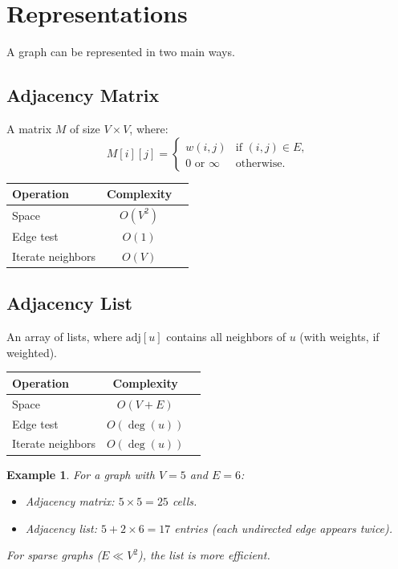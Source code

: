 \documentclass[11pt,a4paper]{article}
\newtheorem{example}[theorem]{Example}
\begin{document}
\section{Representations}

A graph can be represented in two main ways.

\subsection{Adjacency Matrix}

A matrix $M$ of size $V \times V$, where:
\[
M[i][j] = \begin{cases}
w(i, j) & \text{if } (i, j) \in E, \\
0 \text{ or } \infty & \text{otherwise.}
\end{cases}
\]

\begin{center}
\begin{tabular}{lcc}
\toprule
Operation & Complexity \\
\midrule
Space & $O(V^2)$ \\
Edge test & $O(1)$ \\
Iterate neighbors & $O(V)$ \\
\bottomrule
\end{tabular}
\end{center}

\subsection{Adjacency List}

An array of lists, where $\text{adj}[u]$ contains all neighbors of $u$ (with weights, if weighted).

\begin{center}
\begin{tabular}{lcc}
\toprule
Operation & Complexity \\
\midrule
Space & $O(V + E)$ \\
Edge test & $O(\deg(u))$ \\
Iterate neighbors & $O(\deg(u))$ \\
\bottomrule
\end{tabular}
\end{center}

\begin{example}
For a graph with $V = 5$ and $E = 6$:
\begin{itemize}
    \item Adjacency matrix: $5 \times 5 = 25$ cells.
    \item Adjacency list: $5 + 2 \times 6 = 17$ entries (each undirected edge appears twice).
\end{itemize}
For sparse graphs ($E \ll V^2$), the list is more efficient.
\end{example}
\end{document}
